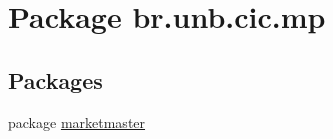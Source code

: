 \hypertarget{namespacebr_1_1unb_1_1cic_1_1mp}{}\section{Package br.\+unb.\+cic.\+mp}
\label{namespacebr_1_1unb_1_1cic_1_1mp}
\subsection*{Packages}
\begin{DoxyCompactItemize}
\item 
package \mbox{\hyperlink{namespacebr_1_1unb_1_1cic_1_1mp_1_1marketmaster}{marketmaster}}
\end{DoxyCompactItemize}
